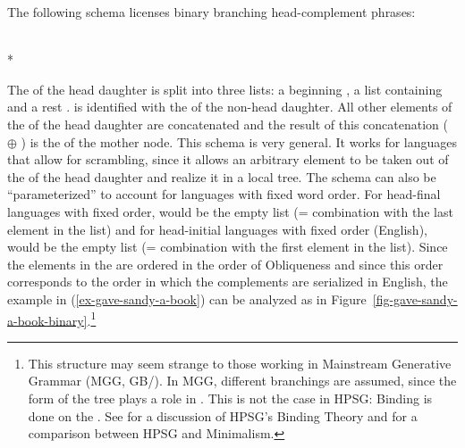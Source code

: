 \documentclass[output=paper]{langsci/langscibook}
\begin{document}
The following schema licenses binary branching head-complement phrases:
\begin{schema}
\label{hcs-binary}
 \impl\\*
\end{schema}
The \compsl of the head daughter is split into three lists: a beginning , a list containing  and a rest
.  is identified with the \synsemv of the non-head daughter. All other elements of
the \compsl of the head daughter are concatenated and the result of this concatenation (
$\oplus$ ) is the \compsl of the mother node. This schema is very general. It works for
languages that allow for scrambling, since it allows an arbitrary element to be taken out of the \compsl
of the head daughter and realize it in a local tree. The schema can also be ``parameterized'' to account
for languages with fixed word order. For head-final languages with fixed order,  would be the
empty list (= combination with the last element in the list) and for head-initial languages with
fixed order (\eg English),  would be the empty list (= combination with the first element in
the list). Since the elements in the \compsl are ordered in the order of Obliqueness \citep{KC77a,Pullum77a} and since this
order corresponds to the order in which the complements are serialized in English, the example in (\ref{ex-gave-sandy-a-book}) can be
analyzed as in Figure~\ref{fig-gave-sandy-a-book-binary}.\footnote{
  This structure may seem strange to those working in Mainstream Generative Grammar (MGG,
  GB/). In MGG, different branchings are assumed, since the form of the tree plays a role in
  . This is not the case in HPSG: Binding is done on the \argstl. See
   for a discussion of HPSG's Binding Theory and
   for a comparison between HPSG and Minimalism.%
}
\end{document}
